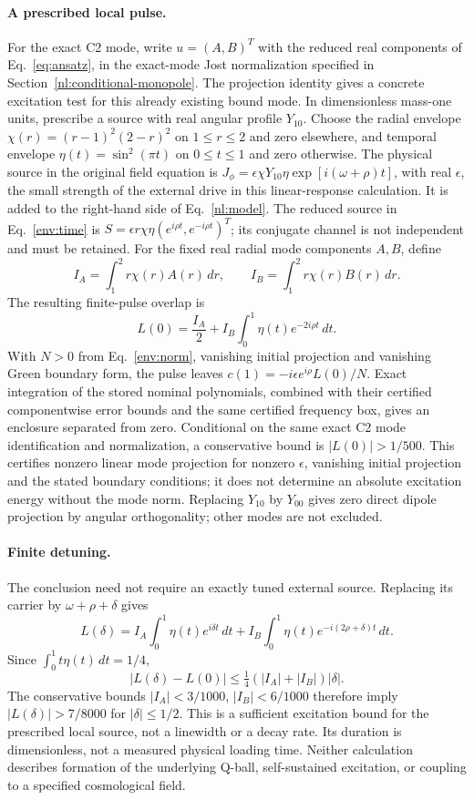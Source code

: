 \paragraph{A prescribed local pulse.}
For the exact C2 mode, write $u=(A,B)^T$ with the reduced real components
of Eq.~\eqref{eq:ansatz}, in the exact-mode Jost normalization specified in
Section~\ref{nl:conditional-monopole}. The projection identity gives a
concrete excitation test for this already existing bound mode.
In dimensionless mass-one units, prescribe a source with real angular
profile $Y_{10}$. Choose the radial envelope
$\chi(r)=(r-1)^2(2-r)^2$ on $1\le r\le2$
and zero elsewhere, and temporal envelope $\eta(t)=\sin^2(\pi t)$ on
$0\le t\le1$ and zero otherwise. The physical source in the original field equation is
$J_\phi=\epsilon\chi Y_{10}\eta\exp[i(\omega+\rho)t]$, with real
$\epsilon$, the small strength of the external drive in this linear-response
calculation. It is added to the right-hand side of Eq.~\eqref{nl:model}.
The reduced source in Eq.~\eqref{env:time} is
$S=\epsilon r\chi\eta(e^{i\rho t},e^{-i\rho t})^T$;
its conjugate channel is not independent and must be retained. For the fixed real
radial mode components $A,B$, define
\[
 I_A=\int_1^2 r\chi(r)A(r)\,dr,\qquad
 I_B=\int_1^2 r\chi(r)B(r)\,dr.
\]
The resulting finite-pulse overlap is
\[
L(0)=\frac{I_A}{2}+I_B\int_0^1\eta(t)e^{-2i\rho t}\,dt.
\]
With $N>0$ from Eq.~\eqref{env:norm}, vanishing initial projection and
vanishing Green boundary form, the pulse leaves
$c(1)=-i\epsilon e^{i\rho}L(0)/N$.
Exact integration of the stored nominal polynomials, combined with their
certified componentwise error bounds and the same certified frequency box,
gives an enclosure separated from zero. Conditional on the same exact C2
mode identification and normalization,
a conservative bound is $|L(0)|>1/500$. This certifies nonzero linear mode
projection for nonzero $\epsilon$, vanishing initial projection and the
stated boundary conditions; it does not determine an absolute excitation
energy without the mode norm. Replacing $Y_{10}$ by $Y_{00}$ gives zero
direct dipole projection by angular orthogonality; other modes are not excluded.

\paragraph{Finite detuning.}
The conclusion need not require an exactly tuned external source. Replacing
its carrier by $\omega+\rho+\delta$ gives
\[
 L(\delta)=I_A\int_0^1\eta(t)e^{i\delta t}\,dt
 +I_B\int_0^1\eta(t)e^{-i(2\rho+\delta)t}\,dt.
\]
Since $\int_0^1t\eta(t)\,dt=1/4$,
\[
 |L(\delta)-L(0)|\le\tfrac14(|I_A|+|I_B|)|\delta|.
\]
The conservative bounds $|I_A|<3/1000$, $|I_B|<6/1000$ therefore imply
$|L(\delta)|>7/8000$ for $|\delta|\le1/2$. This is a sufficient excitation
bound for the prescribed local source, not a linewidth or a decay rate.
Its duration is dimensionless, not a measured physical loading time.
Neither calculation describes formation of the underlying Q-ball,
self-sustained excitation, or coupling to a specified cosmological field.
